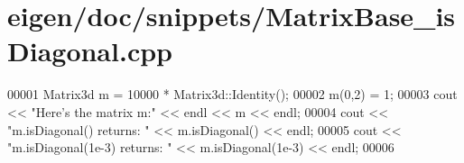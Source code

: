 \hypertarget{eigen_2doc_2snippets_2_matrix_base__is_diagonal_8cpp_source}{}\section{eigen/doc/snippets/\+Matrix\+Base\+\_\+is\+Diagonal.cpp}
\label{eigen_2doc_2snippets_2_matrix_base__is_diagonal_8cpp_source}

\begin{DoxyCode}
00001 Matrix3d m = 10000 * Matrix3d::Identity();
00002 m(0,2) = 1;
00003 cout << \textcolor{stringliteral}{"Here's the matrix m:"} << endl << m << endl;
00004 cout << \textcolor{stringliteral}{"m.isDiagonal() returns: "} << m.isDiagonal() << endl;
00005 cout << \textcolor{stringliteral}{"m.isDiagonal(1e-3) returns: "} << m.isDiagonal(1e-3) << endl;
00006 
\end{DoxyCode}
